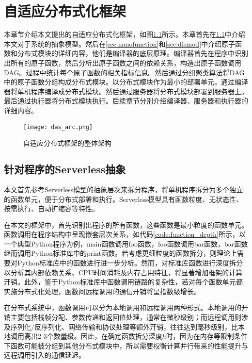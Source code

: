 \chapter{自适应分布式化框架}



本章节介绍本文提出的自适应分布式化框架，如图\ref{fig:overview}所示。本章首先在\ref{sec:serverless}中介绍本文对于系统的抽象模型。然后在\ref{sec:nanofunction}和\ref{sec:dismod}中介绍原子函数和分布式模块的详细内容，他们是编译器的底层原理。编译器首先在程序中识别出所有的原子函数，然后分析出原子函数之间的依赖关系，构造出原子函数调用DAG。过程中统计每个原子函数的相关指标信息。然后通过分组聚类算法将DAG中的原子函数分组构成分布式模块。以分布式模块作为最小的部署单元。通过编译器将单机程序编译成分布式模块。然后通过服务器将分布式模块部署到服务器上。最后通过执行器将分布式模块执行。后续章节分别介绍编译器、服务器和执行器的详细内容。

\begin{figure}[ht]
	\centering
    \texttt{[image: das\_arc.png]}
    \vspace{8pt}
	\caption{自适应分布式框架的整体架构}
    \label{fig:overview}
\end{figure}



\section{针对程序的Serverless抽象}
\label{sec:serverless}
本文首先参考Serverless模型的抽象层次来拆分程序，将单机程序拆分为多个独立的函数单元，便于分布式部署和执行。Serverless模型具有函数粒度、无状态性、按需执行、自动扩缩容等特性。

在本文的框架中，首先识别出程序的所有函数，这些函数是最小粒度的函数单元。
函数调用在程序结构中呈现嵌套层次关系，如代码\ref{code:function_depth}所示，以一个典型Python程序为例，main函数调用foo函数，foo函数调用bar函数，bar函数继而调用Python标准库中的print函数。若考虑更细粒度的函数拆分，则理论上需要对Python标准库中的函数进行进一步分析。然而，对标准库函数进行深度拆分以分析其内部依赖关系、CPU时间消耗及内存占用特征，将显著增加框架的计算开销。此外，鉴于Python标准库中函数调用链路的复杂性，若对每个函数单元都实施分布式化处理，函数间远程调用的通信开销将呈指数级增长。

在分布式系统中，函数调用可以分为本地调用和远程调用两种形式。本地调用的开销主要包括栈帧分配、参数传递和返回值处理，通常在微秒级别；而远程调用则涉及序列化/反序列化、网络传输和协议处理等额外开销，往往达到毫秒级别，比本地调用高出2-3个数量级。因此，在确定函数拆分深度$h$时，因为在内存等限制条件下函数可能被分组到其他分布式模块中，所以需要权衡计算并行带来的性能提升与远程调用引入的通信延迟。



